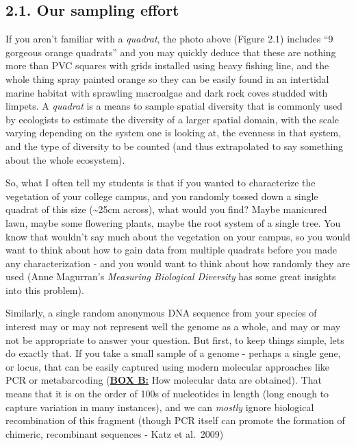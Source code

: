 \documentclass[
]{article}
\begin{document}
\hypertarget{our-sampling-effort}{%
\subsection{2.1. Our sampling effort}\label{our-sampling-effort}}

If you aren't familiar with a \emph{quadrat}, the photo above (Figure
2.1) includes ``9 gorgeous orange quadrats'' and you may quickly deduce
that these are nothing more than PVC squares with grids installed using
heavy fishing line, and the whole thing spray painted orange so they can
be easily found in an intertidal marine habitat with sprawling
macroalgae and dark rock coves studded with limpets. A \emph{quadrat} is
a means to sample spatial diversity that is commonly used by ecologists
to estimate the diversity of a larger spatial domain, with the scale
varying depending on the system one is looking at, the evenness in that
system, and the type of diversity to be counted (and thus extrapolated
to say something about the whole ecosystem).

So, what I often tell my students is that if you wanted to characterize
the vegetation of your college campus, and you randomly tossed down a
single quadrat of this size (\textasciitilde25cm across), what would you
find? Maybe manicured lawn, maybe some flowering plants, maybe the root
system of a single tree. You know that wouldn't say much about the
vegetation on your campus, so you would want to think about how to gain
data from multiple quadrats before you made any characterization - and
you would want to think about how randomly they are used (Anne
Magurran's \emph{Measuring Biological Diversity} has some great insights
into this problem).

Similarly, a single random anonymous DNA sequence from your species of
interest may or may not represent well the genome as a whole, and may or
may not be appropriate to answer your question. But first, to keep
things simple, lets do exactly that. If you take a small sample of a
genome - perhaps a single gene, or locus, that can be easily captured
using modern molecular approaches like PCR or metabarcoding
(\protect\hyperlink{BoxB}{\textbf{BOX B:}} How molecular data are
obtained). That means that it is on the order of 100s of nucleotides in
length (long enough to capture variation in many instances), and we can
\emph{mostly} ignore biological recombination of this fragment (though
PCR itself can promote the formation of chimeric, recombinant sequences
- Katz et al.~2009)
\end{document}
